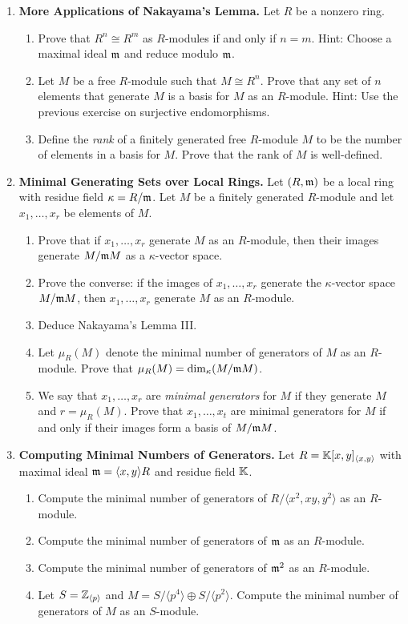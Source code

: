 \documentclass[12pt,reqno]{amsart}
\begin{document}
\begin{enumerate}[leftmargin=*, resume=problems]
\item \textbf{More Applications of Nakayama's Lemma.} Let $R$ be a nonzero ring.
\begin{enumerate}
	\item Prove that $R^{n}\cong R^{m}$ as $R$-modules if and only if $n=m$. Hint: Choose a maximal ideal $\mathfrak{m}$ and reduce modulo $\mathfrak{m}$.
	\item Let $M$ be a free $R$-module such that $M \cong R^{n}$. Prove that any set of $n$ elements that generate $M$ is a basis for $M$ as an $R$-module. Hint: Use the previous exercise on surjective endomorphisms.
	\item Define the \emph{rank} of a finitely generated free $R$-module $M$ to be the number of elements in a basis for $M$. Prove that the rank of $M$ is well-defined.
\end{enumerate}

\item \textbf{Minimal Generating Sets over Local Rings.} Let $(R,\mathfrak{m})$ be a local ring with residue field $\kappa=R/\mathfrak{m}$. Let $M$ be a finitely generated $R$-module and let $x_1,\ldots,x_r$ be elements of $M$.
\begin{enumerate}
    \item Prove that if $x_1,\ldots,x_r$ generate $M$ as an $R$-module, then their images generate $M/\mathfrak{m} M$ as a $\kappa$-vector space.
    \item Prove the converse: if the images of $x_1,\ldots,x_r$ generate the $\kappa$-vector space $M/\mathfrak{m} M$, then $x_1,\ldots,x_r$ generate $M$ as an $R$-module.
    \item Deduce Nakayama's Lemma III.
    \item Let $\mu_R(M)$ denote the minimal number of generators of $M$ as an $R$-module. Prove that $\mu_R(M)=\dim_{\kappa}(M/\mathfrak{m} M)$. 
    \item We say that $x_{1},\ldots,x_{r}$ are \emph{minimal generators} for $M$ if they generate $M$ and $r=\mu_{R}(M)$. Prove that $x_1,\ldots,x_t$ are minimal generators for $M$ if and only if their images form a basis of $M/\mathfrak{m} M$.
\end{enumerate}

\item \textbf{Computing Minimal Numbers of Generators.} Let $R=\mathbb{K}[x,y]_{\langle x,y\rangle}$ with maximal ideal $\mathfrak{m}=\langle x,y\rangle R$ and residue field $\mathbb{K}$.
\begin{enumerate}
    \item Compute the minimal number of generators of $R/\langle x^2,xy,y^2\rangle$ as an $R$-module.
    \item Compute the minimal number of generators of $\mathfrak{m}$ as an $R$-module.
    \item Compute the minimal number of generators of $\mathfrak{m}^2$ as an $R$-module.
    \item Let $S=\mathbb{Z}_{\langle p\rangle}$ and $M=S/\langle p^4\rangle\oplus S/\langle p^2\rangle$. Compute the minimal number of generators of $M$ as an $S$-module.
\end{enumerate}


\end{enumerate}
\end{document}
